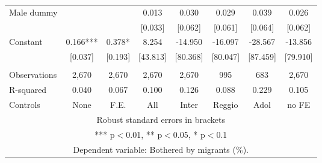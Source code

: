 \begin{tabular}{lccccccc}
Male dummy &  &  & 0.013 & 0.030 & 0.029 & 0.039 & 0.026 \\
 &  &  & [0.033] & [0.062] & [0.061] & [0.064] & [0.062] \\
Constant & 0.166*** & 0.378* & 8.254 & -14.950 & -16.097 & -28.567 & -13.856 \\
 & [0.037] & [0.193] & [43.813] & [80.368] & [80.047] & [87.459] & [79.910] \\
 &  &  &  &  &  &  &  \\
Observations & 2,670 & 2,670 & 2,670 & 2,670 & 995 & 683 & 2,670 \\
R-squared & 0.040 & 0.067 & 0.100 & 0.126 & 0.088 & 0.229 & 0.105 \\
 Controls & None & F.E. & All & Inter & Reggio & Adol & no FE \\ \hline
\multicolumn{8}{c}{ Robust standard errors in brackets} \\
\multicolumn{8}{c}{ *** p$<$0.01, ** p$<$0.05, * p$<$0.1} \\
\multicolumn{8}{c}{ Dependent variable: Bothered by migrants (\%).} \\
\end{tabular}
